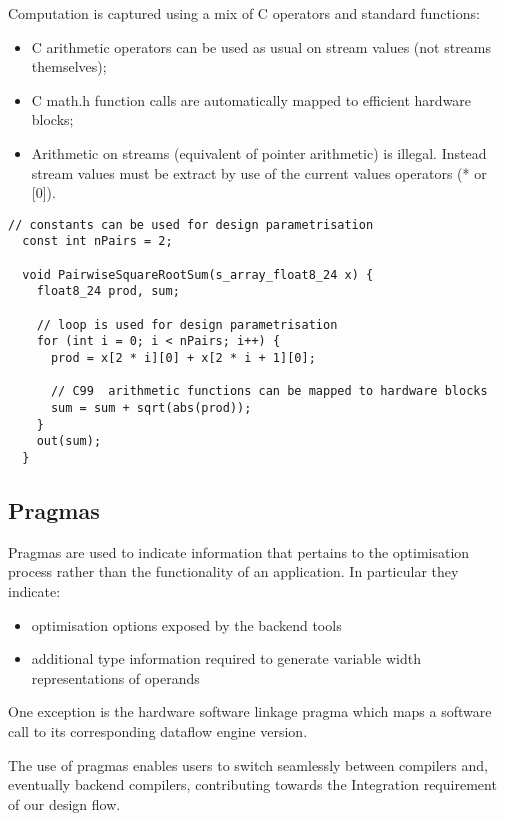 Computation is captured using a mix of C operators and standard
functions:
\begin{itemize}
\item C arithmetic operators can be used as usual on stream values (not streams themselves);
\item C math.h function calls are automatically mapped to efficient hardware blocks;
\item Arithmetic on streams (equivalent of pointer arithmetic) is
  illegal. Instead stream values must be extract by use of the current
  values operators (* or [0]).
\end{itemize}

\begin{lstlisting}[caption={Compute and control example in \FAST{}}, label={lst:fast-compute-control}]
  // constants can be used for design parametrisation
  const int nPairs = 2;

  void PairwiseSquareRootSum(s_array_float8_24 x) {
    float8_24 prod, sum;

    // loop is used for design parametrisation
    for (int i = 0; i < nPairs; i++) {
      prod = x[2 * i][0] + x[2 * i + 1][0];

      // C99  arithmetic functions can be mapped to hardware blocks
      sum = sum + sqrt(abs(prod));
    }
    out(sum);
  }
\end{lstlisting}

\subsection{Pragmas}

Pragmas are used to indicate information that pertains to the
optimisation process rather than the functionality of an
application. In particular they indicate:
\begin{itemize}
\item optimisation options exposed by the backend tools
\item additional type information required to generate variable width
  representations of operands
\end{itemize}

One exception is the hardware software linkage pragma which maps a
software call to its corresponding dataflow engine version.

The use of pragmas enables users to switch seamlessly between
compilers and, eventually backend compilers, contributing towards the
Integration requirement of our design flow.

